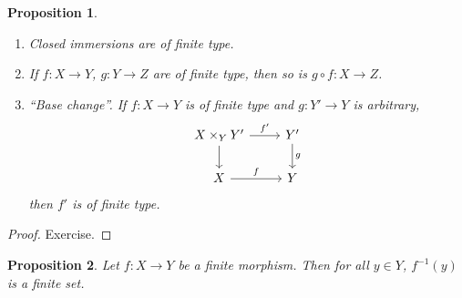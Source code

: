 \documentclass[12pt]{article}
\newtheorem*{proposition}{Proposition}
\theoremstyle{definition}
\begin{document}
\begin{proposition}
\begin{enumerate}[label=\arabic*)]
\item Closed immersions are of finite type.

\item If $f:X\rightarrow Y$, $g:Y\rightarrow Z$ are of finite type, then so is $g\circ f:X\rightarrow Z$.

\item ``Base change''. If $f:X\rightarrow Y$ is of finite type and $g:Y'\rightarrow Y$ is arbitrary,
\[\begin{tikzcd}X\times_YY'\arrow[r,"f'"]\arrow[d]&Y'\arrow[d,"g"]\\X\arrow[r,"f"]&Y\end{tikzcd}\]
then $f'$ is of finite type.
\end{enumerate}
\end{proposition}

\begin{proof}
Exercise.
\end{proof}

\begin{proposition}
Let $f:X\rightarrow Y$ be a finite morphism. Then for all $y\in Y$, $f^{-1}(y)$ is a finite set.
\end{proposition}
\end{document}
